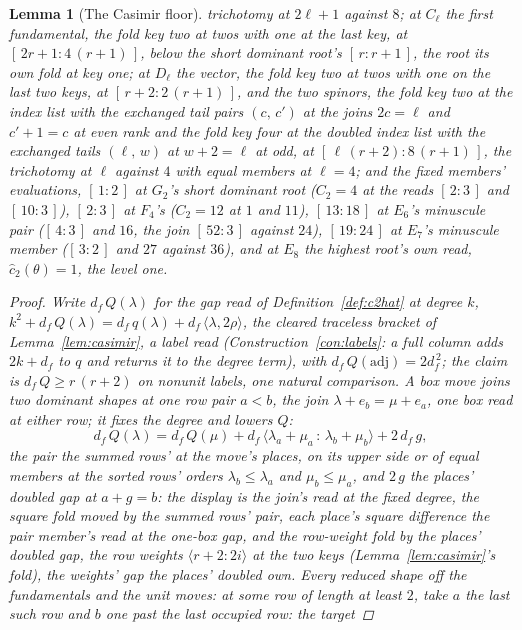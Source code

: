 \documentclass[11pt]{article}
\newtheorem{lemma}{Lemma}
\theoremstyle{definition}
\begin{document}
\begin{lemma}[The Casimir floor]
trichotomy at $2\ell+1$ against $8$; at $C_\ell$ the first
fundamental, the fold key two at twos with one at the last key,
at $[\,2r+1:4\,(r+1)\,]$, below the short dominant
root's $[\,r:r+1\,]$, the root its own fold at key one; at
$D_\ell$ the vector, the fold key two at twos with one on the
last two keys, at
$[\,r+2:2\,(r+1)\,]$, and the two spinors, the fold key two at
the index list with the exchanged tail pairs $(c,\,c')$ at the
joins $2c=\ell$ and $c'+1=c$ at even rank and the fold key four
at the doubled index list with the exchanged tails $(\ell,\,w)$
at $w+2=\ell$ at odd, at
$[\,\ell\,(r+2):8\,(r+1)\,]$, the trichotomy at $\ell$
against $4$ with equal members at $\ell=4$; and the fixed
members' evaluations, $[\,1:2\,]$ at $G_2$'s short dominant root
($C_2=4$ at the reads $[\,2:3\,]$ and $[\,10:3\,]$),
$[\,2:3\,]$ at $F_4$'s ($C_2=12$ at $1$ and $11$),
$[\,13:18\,]$ at $E_6$'s minuscule pair ($[\,4:3\,]$ and $16$,
the join $[\,52:3\,]$ against $24$), $[\,19:24\,]$ at $E_7$'s
minuscule member ($[\,3:2\,]$ and $27$ against $36$), and at
$E_8$ the highest root's own read,
$\hat c_2(\theta)=1$, the level one.
\begin{proof}
Write $d_f\,Q(\lambda)$ for the gap read of
Definition~\ref{def:c2hat} at degree $k$,
$k^2+d_f\,Q(\lambda)=d_f\,q(\lambda)+d_f\,\langle\lambda,2\rho\rangle$,
the cleared traceless bracket of Lemma~\ref{lem:casimir}, a label read
(Construction~\ref{con:labels}: a full column adds $2k+d_f$ to $q$ and
returns it to the degree term), with $d_f\,Q(\mathrm{adj})=2d_f^{\,2}$; the claim
is $d_f\,Q\ge r\,(r+2)$ on nonunit labels, one natural comparison. A
\emph{box move} joins two dominant shapes at one row pair $a<b$, the
join
$\lambda+e_b=\mu+e_a$, one box read at either row; it fixes the
degree and lowers $Q$:
\[
d_f\,Q(\lambda)
=d_f\,Q(\mu)
+d_f\,\big\langle\lambda_a+\mu_a\,:\,\lambda_b+\mu_b\big\rangle
+2\,d_f\,g ,
\]
the pair the summed rows' at the move's places, on its upper side or
of equal members at the sorted rows' orders $\lambda_b\le\lambda_a$
and $\mu_b\le\mu_a$, and
$2\,g$ the places' doubled gap at $a+g=b$: the display is the
join's read at the fixed degree, the square fold moved by the
summed rows' pair, each place's square difference the pair
member's read at the one-box gap, and the row-weight fold by the
places' doubled gap, the row weights
$\langle r+2\!:\!2i\rangle$ at the two keys
(Lemma~\ref{lem:casimir}'s fold), the weights' gap the places'
doubled own.
Every reduced shape off
the fundamentals and the unit moves: at some row of length at least $2$, take $a$ the
last such row and $b$ one past the last occupied row: the target

\end{proof}
\end{lemma}
\end{document}
